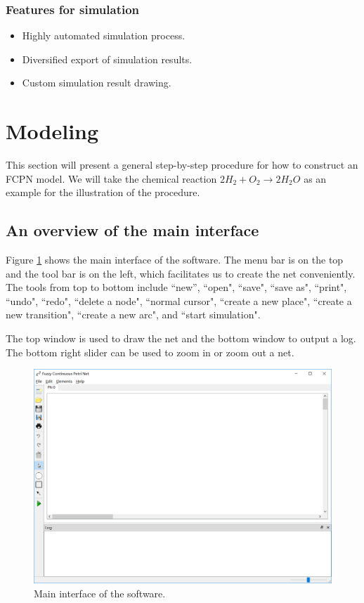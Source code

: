 \documentclass[journal,a4paper,onecolumn]{article}
\begin{document}
\subsubsection{Features for simulation}
\begin{itemize}
	\item Highly automated simulation process.
	\item Diversified export of simulation results.
	\item Custom simulation result drawing.
\end{itemize}






\clearpage
\section{Modeling}

This section will present a general step-by-step procedure for how to construct an FCPN model. We will take the chemical reaction $2H_2+O_2\to 2H_2O$ as an example \cite{Mur89} for the illustration of the procedure.

\subsection{An overview of the main interface}
Figure \ref{fig:Maininterface} shows the main interface of the software. 
The menu bar is on the top and the tool bar is on the left, which facilitates us to create the net conveniently. The tools from top to bottom include ``new'', ``open", ``save", ``save as", ``print", ``undo", ``redo", ``delete a node", ``normal cursor", ``create a new place", ``create a new transition", ``create a new arc", and ``start simulation". 

The top window is used to draw the net and the bottom window to output a log. The bottom right slider can be used to zoom in or zoom out a net.

\begin{figure}[!hbt]
	\begin{center}
		\includegraphics[width=\columnwidth]{fig1}
		\caption{Main interface of the software.}
		\label{fig:Maininterface}
	\end{center}
\end{figure}
\end{document}
